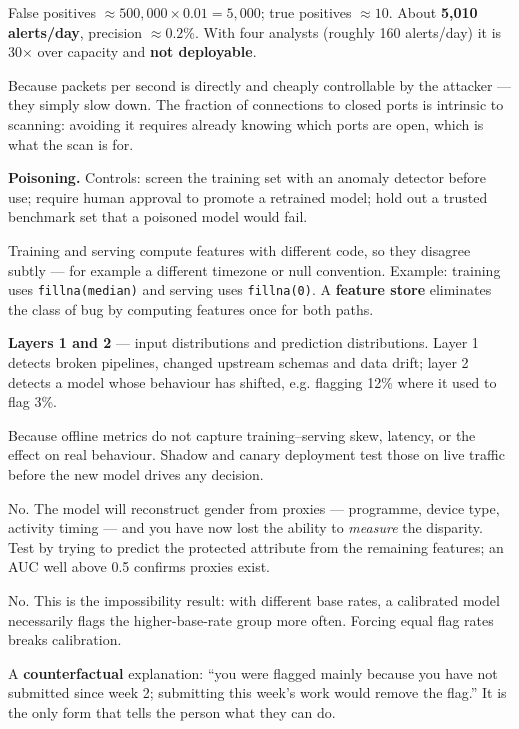 \begin{ans}
  \item False positives $\approx 500{,}000 \times 0.01 = 5{,}000$; true positives
        $\approx 10$. About \textbf{5{,}010 alerts/day}, precision $\approx 0.2\%$.
        With four analysts (roughly 160 alerts/day) it is 30$\times$ over capacity
        and \textbf{not deployable}.
  \item Because packets per second is directly and cheaply controllable by the
        attacker --- they simply slow down. The fraction of connections to closed
        ports is intrinsic to scanning: avoiding it requires already knowing which
        ports are open, which is what the scan is for.
  \item \textbf{Poisoning.} Controls: screen the training set with an anomaly
        detector before use; require human approval to promote a retrained model;
        hold out a trusted benchmark set that a poisoned model would fail.
\end{ans}

\begin{ans}
  \item Training and serving compute features with different code, so they disagree
        subtly --- for example a different timezone or null convention. Example:
        training uses \texttt{fillna(median)} and serving uses \texttt{fillna(0)}.
        A \textbf{feature store} eliminates the class of bug by computing features
        once for both paths.
  \item \textbf{Layers 1 and 2} --- input distributions and prediction
        distributions. Layer 1 detects broken pipelines, changed upstream schemas and
        data drift; layer 2 detects a model whose behaviour has shifted, e.g. flagging
        12\% where it used to flag 3\%.
  \item Because offline metrics do not capture training--serving skew, latency,
        or the effect on real behaviour. Shadow and canary deployment test those on
        live traffic before the new model drives any decision.
\end{ans}

\begin{ans}
  \item No. The model will reconstruct gender from proxies --- programme, device
        type, activity timing --- and you have now lost the ability to \emph{measure}
        the disparity. Test by trying to predict the protected attribute from the
        remaining features; an AUC well above 0.5 confirms proxies exist.
  \item No. This is the impossibility result: with different base rates, a calibrated
        model necessarily flags the higher-base-rate group more often. Forcing equal
        flag rates breaks calibration.
  \item A \textbf{counterfactual} explanation: ``you were flagged mainly because you
        have not submitted since week 2; submitting this week's work would remove the
        flag.'' It is the only form that tells the person what they can do.
\end{ans}


